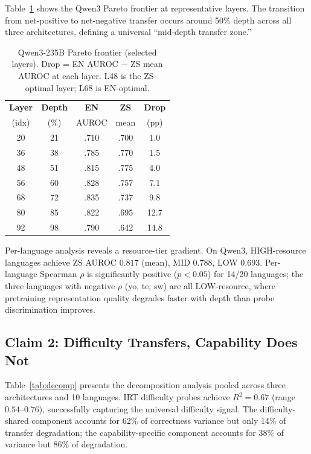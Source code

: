 \documentclass[11pt,a4paper]{article}
\begin{document}
Table~\ref{tab:pareto_qwen} shows the Qwen3 Pareto frontier at representative layers.
The transition from net-positive to net-negative transfer occurs around 50\% depth across all three architectures, defining a universal ``mid-depth transfer zone.''

\begin{table}[t]
\centering
\small
\begin{tabular}{@{}ccccc@{}}
\toprule
\textbf{Layer} & \textbf{Depth} & \textbf{EN} & \textbf{ZS} & \textbf{Drop} \\
(idx) & (\%) & AUROC & mean & (pp) \\
\midrule
20 & 21 & .710 & .700 & 1.0 \\
36 & 38 & .785 & .770 & 1.5 \\
48 & 51 & .815 & .775 & 4.0 \\
56 & 60 & .828 & .757 & 7.1 \\
68 & 72 & .835 & .737 & 9.8 \\
80 & 85 & .822 & .695 & 12.7 \\
92 & 98 & .790 & .642 & 14.8 \\
\bottomrule
\end{tabular}
\caption{Qwen3-235B Pareto frontier (selected layers). Drop = EN AUROC $-$ ZS mean AUROC at each layer. L48 is the ZS-optimal layer; L68 is EN-optimal.}
\label{tab:pareto_qwen}
\end{table}

Per-language analysis reveals a resource-tier gradient.
On Qwen3, HIGH-resource languages achieve ZS AUROC $0.817$ (mean), MID $0.788$, LOW $0.693$.
Per-language Spearman $\rho$ is significantly positive ($p{<}0.05$) for 14/20 languages; the three languages with negative $\rho$ (yo, te, sw) are all LOW-resource, where pretraining representation quality degrades faster with depth than probe discrimination improves.


\subsection{Claim 2: Difficulty Transfers, Capability Does Not}
\label{sec:decomposition_results}

Table~\ref{tab:decomp} presents the decomposition analysis pooled across three architectures and 10 languages.
IRT difficulty probes achieve $R^2{=}0.67$ (range $0.54$--$0.76$), successfully capturing the universal difficulty signal.
The difficulty-shared component accounts for 62\% of correctness variance but only 14\% of transfer degradation; the capability-specific component accounts for 38\% of variance but 86\% of degradation.
\end{document}
